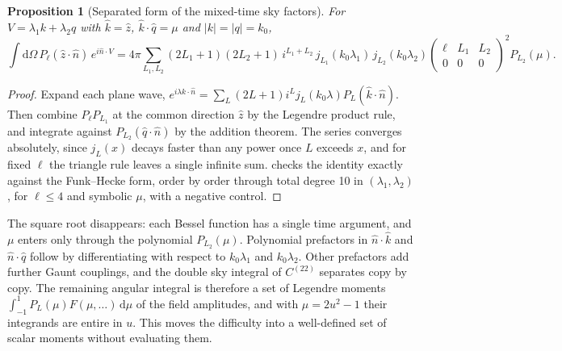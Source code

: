 \documentclass[11pt]{article}
\newtheorem{proposition}[theorem]{Proposition}
\theoremstyle{definition}
\theoremstyle{remark}
\newcommand{\nh}{\hat n}
\newcommand{\dd}{\mathrm{d}}
\begin{document}
\begin{proposition}[Separated form of the mixed-time sky factors]\label{prop:translation}
For $V=\lambda_1k+\lambda_2q$ with $\hat k=\hat z$, $\hat k\cdot\hat q=\mu$ and $|k|=|q|=k_0$,
\[
\int\dd\Omega\,P_\ell(\hat z\cdot\nh)\,e^{i\nh\cdot V}
=4\pi\sum_{L_1,L_2}(2L_1+1)(2L_2+1)\,i^{L_1+L_2}\,j_{L_1}(k_0\lambda_1)\,j_{L_2}(k_0\lambda_2)
\begin{pmatrix}\ell&L_1&L_2\\0&0&0\end{pmatrix}^{\!2}P_{L_2}(\mu).
\]
\end{proposition}
\begin{proof}
Expand each plane wave, $e^{i\lambda k\cdot\nh}=\sum_L(2L+1)i^Lj_L(k_0\lambda)P_L(\hat k\cdot\nh)$. Then
combine $P_\ell P_{L_1}$ at the common direction $\hat z$ by the Legendre product rule, and integrate
against $P_{L_2}(\hat q\cdot\nh)$ by the addition theorem. The series converges absolutely, since
$j_L(x)$ decays faster than any power once $L$ exceeds $x$, and for fixed $\ell$ the triangle
rule leaves a single infinite sum.  checks the identity
exactly against the Funk--Hecke form, order by order through total degree 10 in
$(\lambda_1,\lambda_2)$, for $\ell\le4$ and symbolic $\mu$, with a negative control.
\end{proof}
The square root disappears: each Bessel function has a single time argument, and $\mu$
enters only through the polynomial $P_{L_2}(\mu)$. Polynomial prefactors in $\nh\cdot\hat k$ and
$\nh\cdot\hat q$ follow by differentiating with respect to $k_0\lambda_1$ and $k_0\lambda_2$. Other
prefactors add further Gaunt couplings, and the double sky integral of $C^{(22)}$ separates
copy by copy. The remaining angular integral is therefore a set of Legendre moments
$\int_{-1}^1P_L(\mu)F(\mu,\ldots)\,\dd\mu$ of the field amplitudes, and with $\mu=2u^2-1$ their
integrands are entire in $u$. This moves the difficulty into a well-defined set of scalar
moments without evaluating them.
\end{document}
